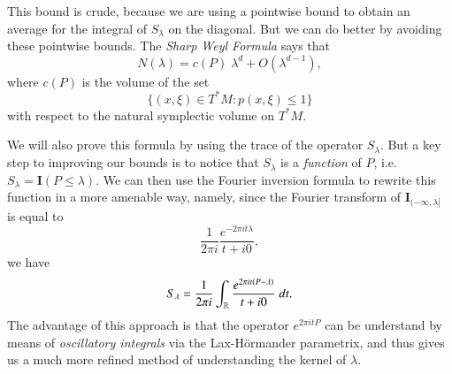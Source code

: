 This bound is crude, because we are using a pointwise bound to obtain an average for the integral of $S_\lambda$ on the diagonal. But we can do better by avoiding these pointwise bounds. The \emph{Sharp Weyl Formula} says that
%
\[ N(\lambda) = c(P)\; \lambda^d + O(\lambda^{d-1}), \]
%
where $c(P)$ is the volume of the set
%
\[ \{ (x,\xi) \in T^* M : p(x,\xi) \leq 1 \} \]
%
with respect to the natural symplectic volume on $T^* M$.

We will also prove this formula by using the trace of the operator $S_\lambda$. But a key step to improving our bounds is to notice that $S_\lambda$ is a \emph{function} of $P$, i.e. $S_\lambda = \mathbf{I}(P \leq \lambda)$. We can then use the Fourier inversion formula to rewrite this function in a more amenable way, namely, since the Fourier transform of $\mathbf{I}_{(-\infty,\lambda]}$ is equal to
%
\[ \frac{1}{2 \pi i} \frac{e^{-2 \pi i t \lambda}}{t + i 0}, \]
%
we have
%
\[ S_\lambda = \frac{1}{2 \pi i} \int_{\operatorname{\mathbb{R}}} \frac{e^{2 \pi i t (P - \lambda)}}{t + i 0}\; dt. \]
%
The advantage of this approach is that the operator $e^{2 \pi i t P}$ can be understand by means of \emph{oscillatory integrals} via the Lax-H\"{o}rmander parametrix, and thus gives us a much more refined method of understanding the kernel of $\lambda$.




